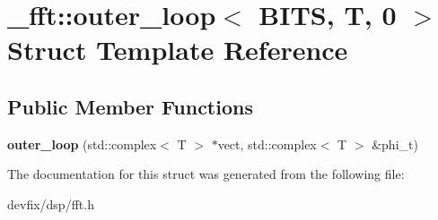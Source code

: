 \hypertarget{struct__fft_1_1outer__loop_3_01BITS_00_01T_00_010_01_4}{}\section{\+\_\+fft\+:\+:outer\+\_\+loop$<$ B\+I\+TS, T, 0 $>$ Struct Template Reference}
\label{struct__fft_1_1outer__loop_3_01BITS_00_01T_00_010_01_4}
\subsection*{Public Member Functions}
\begin{DoxyCompactItemize}
\item 
\mbox{\label{struct__fft_1_1outer__loop_3_01BITS_00_01T_00_010_01_4_af595c8c4145ede5bb9efd10ba1cecb9d}} 
{\bfseries outer\+\_\+loop} (std\+::complex$<$ T $>$ $\ast$vect, std\+::complex$<$ T $>$ \&phi\+\_\+t)
\end{DoxyCompactItemize}


The documentation for this struct was generated from the following file\+:\begin{DoxyCompactItemize}
\item 
devfix/dsp/fft.\+h\end{DoxyCompactItemize}
